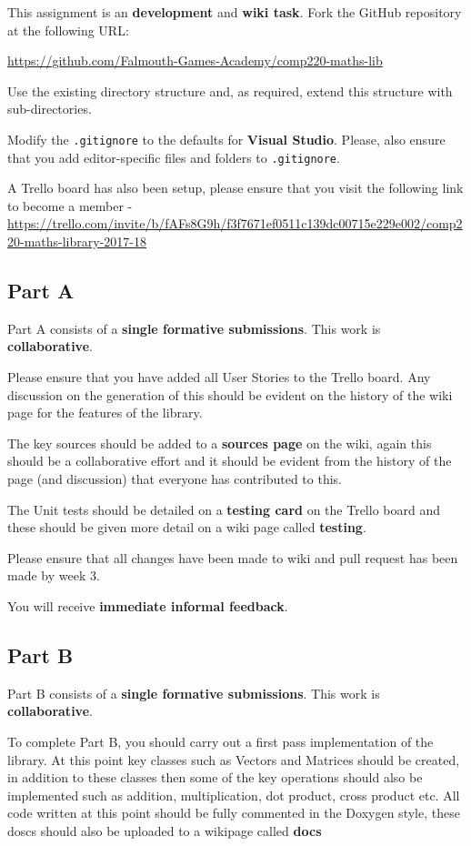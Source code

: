 \documentclass{../../fal_assignment}
\begin{document}
This assignment is an \textbf{development} and \textbf{wiki task}. Fork the GitHub repository at the following URL:

\indent \url{https://github.com/Falmouth-Games-Academy/comp220-maths-lib}

Use the existing directory structure and, as required, extend this structure with sub-directories.

Modify the \texttt{.gitignore} to the defaults for \textbf{Visual Studio}. Please, also ensure that you add editor-specific files and folders to \texttt{.gitignore}. 

A Trello board has also been setup, please ensure that you visit the following link to become a member - \url{https://trello.com/invite/b/fAFs8G9h/f3f7671ef0511c139dc00715e229e002/comp220-maths-library-2017-18}

\subsection*{Part A}

Part A consists of a \textbf{single formative submissions}. This work is \textbf{collaborative}.

Please ensure that you have added all User Stories to the Trello board. Any discussion on the generation of this should be evident on the history of the wiki page for the features of the library.

The key sources should be added to a \textbf{sources page} on the wiki, again this should be a collaborative effort and it should be evident from the history of the page (and discussion) that everyone has contributed to this.

The Unit tests should be detailed on a \textbf{testing card} on the Trello board and these should be given more detail on a wiki page called \textbf{testing}.

Please ensure that all changes have been made to wiki and pull request has been made by week 3. 

You will receive \textbf{immediate informal feedback}.

\subsection*{Part B}

Part B consists of a \textbf{single formative submissions}. This work is \textbf{collaborative}.

To complete Part B, you should carry out a first pass implementation of the library. At this point key classes such as Vectors and Matrices should be created, in addition to these classes then some of the key operations should also be implemented such as addition, multiplication, dot product, cross product etc. All code written at this point should be fully commented in the Doxygen style, these doscs should also be uploaded to a wikipage called \textbf{docs} 
\end{document}
